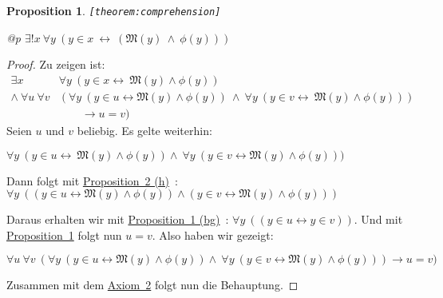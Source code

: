 \documentclass[a4paper,german,10pt,twoside]{book}
\newtheorem{prop}[thm]{Proposition}
\theoremstyle{definition}
\theoremstyle{remark}
\begin{document}
\begin{prop}
\label{theorem:comprehension} \hypertarget{theorem:comprehension}{}
{\tt \tiny [\verb]theorem:comprehension]]}
\mbox{}
\begin{longtable}{{@{\extracolsep{\fill}}p{\linewidth}}}
\centering $\exists! x\ \forall y\ (y \in x\ \leftrightarrow\ (\mathfrak{M}(y)\ \land\ \phi(y)))$
\end{longtable}

\end{prop}
\begin{proof}
Zu zeigen ist:
$$
\begin{array}{rl}
\exists x                      & \forall y \ (y \in x \leftrightarrow  \ \mathfrak{M}(y) \land \phi(y)) \\
\land \ \forall u \ \forall v  & (\forall y \ (y \in u \leftrightarrow \mathfrak{M}(y) \land \phi(y)) \ \land  \ \forall y \ ( y \in v \leftrightarrow \ \mathfrak{M}(y) \land \phi(y))) \\
       & \qquad \rightarrow u = v)
\end{array}
$$
Seien $u$ und $v$ beliebig. Es gelte weiterhin:

\par
$\forall y \ (y \in u \leftrightarrow \ \mathfrak{M}(y) \land \phi(y)) \land \ \forall y \ ( y \in v \leftrightarrow \mathfrak{M}(y)
\land \phi(y)))$

\par
Dann folgt mit \hyperref{http://www.qedeq.org/0_04_07/doc/math/qedeq_logic_v1_de.pdf}{}{theorem:predicateCalculus/h}{Proposition~2 (h)}~\cite{l}: $\forall y \ ((y \in u \leftrightarrow \mathfrak{M}(y) \land \phi(y)) \land (y \in v \leftrightarrow \mathfrak{M}(y) \land \phi(y)))$

\par
Daraus erhalten wir mit \hyperref{http://www.qedeq.org/0_04_07/doc/math/qedeq_logic_v1_de.pdf}{}{theorem:propositionalCalculus/bg}{Proposition~1 (bg)}~\cite{l}: $\forall y \ ((y \in u \leftrightarrow y \in v ))$. Und mit \hyperlink{theorem:extensonalityEquivalence}{Proposition~1} folgt nun $u = v$. Also haben wir gezeigt:

\par
$\forall u \ \forall v \ (\forall y \ (y \in u \leftrightarrow \mathfrak{M}(y) \land \phi(y)) \land \ \forall y \ (y \in v \leftrightarrow \mathfrak{M}(y) \land \phi(y))) \rightarrow u = v)$

\par
Zusammen mit dem \hyperlink{axiom:comprehension}{Axiom~2} folgt nun die Behauptung.
\end{proof}
\end{document}
